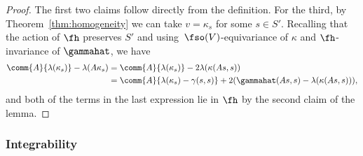 \begin{proof}
	The first two claims follow directly from the definition. For the third, by Theorem~\ref{thm:homogeneity} we can take $v=\kappa_s$ for some $s\in S'$. Recalling that the action of $\fh$ preserves $S'$ and using~$\fso(V)$-equivariance of $\kappa$ and $\fh$-invariance of $\gammahat$, we have
	\begin{align*}
		\comm{A}{\lambda(\kappa_s)} - \lambda(A\kappa_s)
		 &= \comm{A}{\lambda(\kappa_s)} - 2\lambda(\kappa(As,s))\\
		 &= \comm{A}{\lambda(\kappa_s)-\gamma(s,s)} + 2(\gammahat(As,s)-\lambda(\kappa(As,s))),
	\end{align*}
	and both of the terms in the last expression lie in $\fh$ by the second claim of the lemma.
\end{proof}

\subsubsection{Integrability}
\label{sec:integrability}

